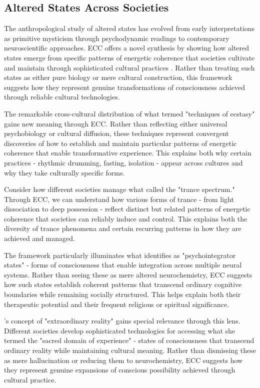 \subsection{Altered States Across Societies}

The anthropological study of altered states has evolved from early interpretations as primitive mysticism through psychodynamic readings to contemporary neuroscientific approaches. ECC offers a novel synthesis by showing how altered states emerge from specific patterns of energetic coherence that societies cultivate and maintain through sophisticated cultural practices \cite{bourguignon1976possession}. Rather than treating such states as either pure biology or mere cultural construction, this framework suggests how they represent genuine transformations of consciousness achieved through reliable cultural technologies.

The remarkable cross-cultural distribution of what \cite{eliade1964shamanism} termed "techniques of ecstasy" gains new meaning through ECC. Rather than reflecting either universal psychobiology or cultural diffusion, these techniques represent convergent discoveries of how to establish and maintain particular patterns of energetic coherence that enable transformative experience. This explains both why certain practices - rhythmic drumming, fasting, isolation - appear across cultures and why they take culturally specific forms.

Consider how different societies manage what \cite{lapassade1990transe} called the "trance spectrum." Through ECC, we can understand how various forms of trance - from light dissociation to deep possession - reflect distinct but related patterns of energetic coherence that societies can reliably induce and control. This explains both the diversity of trance phenomena and certain recurring patterns in how they are achieved and managed.

The framework particularly illuminates what \cite{winkelman2010shamanism} identifies as "psychointegrator states" - forms of consciousness that enable integration across multiple neural systems. Rather than seeing these as mere altered neurochemistry, ECC suggests how such states establish coherent patterns that transcend ordinary cognitive boundaries while remaining socially structured. This helps explain both their therapeutic potential and their frequent religious or spiritual significance.

\cite{myerhoff1974peyote}'s concept of "extraordinary reality" gains special relevance through this lens. Different societies develop sophisticated technologies for accessing what she termed the "sacred domain of experience" - states of consciousness that transcend ordinary reality while maintaining cultural meaning. Rather than dismissing these as mere hallucination or reducing them to neurochemistry, ECC suggests how they represent genuine expansions of conscious possibility achieved through cultural practice.

